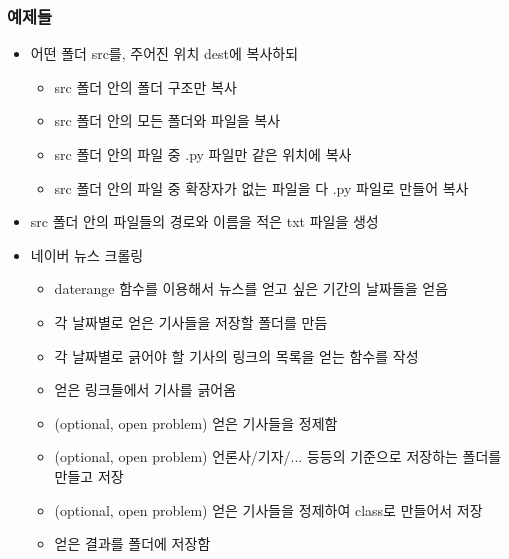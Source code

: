 \documentclass[twoside]{article}
\begin{document}
\subsubsection{예제들}


\begin{itemize}
\item 어떤 폴더 src를, 주어진 위치 dest에 복사하되
\begin{itemize}
\item src 폴더 안의 폴더 구조만 복사 
\item src 폴더 안의 모든 폴더와 파일을 복사 
\item src 폴더 안의 파일 중 .py 파일만 같은 위치에 복사 
\item src 폴더 안의 파일 중 확장자가 없는 파일을 다 .py 파일로 만들어 복사 
\end{itemize}
\item src 폴더 안의 파일들의 경로와 이름을 적은 txt 파일을 생성 
\item 네이버 뉴스 크롤링
\begin{itemize}
\item daterange 함수를 이용해서 뉴스를 얻고 싶은 기간의 날짜들을 얻음 
\item 각 날짜별로 얻은 기사들을 저장할 폴더를 만듬 
\item 각 날짜별로 긁어야 할 기사의 링크의 목록을 얻는 함수를 작성 
\item 얻은 링크들에서 기사를 긁어옴 
\item (optional, open problem) 얻은 기사들을 정제함
\item (optional, open problem) 언론사/기자/... 등등의 기준으로 저장하는 폴더를 만들고 저장
\item (optional, open problem) 얻은 기사들을 정제하여 class로 만들어서 저장 
\item 얻은 결과를 폴더에 저장함 
\end{itemize}
\end{itemize}













                
                

\end{document}
